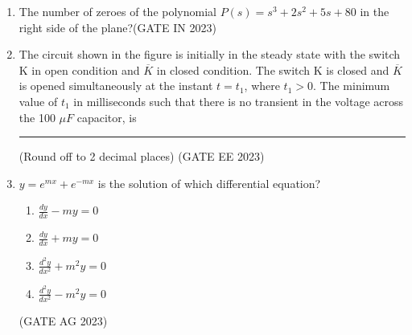 \begin{enumerate}[label=\thechapter.\arabic*,ref=\thechapter.\theenumi]

\item The number of zeroes of the polynomial $P(s) = s^3+2s^2+5s+80$ in the right side of the plane?\hfill(GATE IN 2023) \\

\solution

\newpage

\item The circuit shown in the figure is initially in the steady state with the switch K in open condition and $\overline{K}$ in closed condition. The switch K is closed and $\overline{K}$ is opened simultaneously at the instant $t = t_1$, where $t_1 > 0$. The minimum value of $t_1$ in milliseconds such that there is no transient in the voltage across the 100 $\mu F$ capacitor, is \rule{1cm}{0.15mm} (Round off to 2 decimal places) \hfill (GATE EE 2023)
\\
\solution


\newpage
\item $y=e^{mx}+e^{-mx}$ is the solution of which differential equation?
\begin{enumerate}[label=\textbf{\arabic*.}, font=\bfseries, align=left]
    \item $\frac{dy}{dx} - my = 0$ 
    \item $\frac{dy}{dx} + my = 0$ 
    \item $\frac{d^{2}y}{dx^{2}} + m^{2}y = 0$ 
    \item $\frac{d^{2}y}{dx^{2}} - m^{2}y = 0$ 
\end{enumerate} \hfill(GATE AG 2023)
\solution


\end{enumerate}
